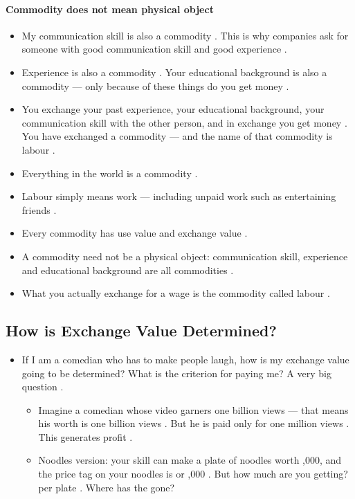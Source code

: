 \paragraph{Commodity does not mean physical object}
\begin{itemize}
    \item My communication skill is also a commodity . This is why companies ask for someone with good communication skill and good experience .
    \item Experience is also a commodity . Your educational background is also a commodity --- only because of these things do you get money .
    \item You exchange your past experience, your educational background, your communication skill with the other person, and in exchange you get money . You have exchanged a commodity --- and the name of that commodity is labour .
    \item Everything in the world is a commodity .
\end{itemize}

\begin{QuickRevision}
\begin{itemize}
    \item Labour simply means work --- including unpaid work such as entertaining friends .
    \item Every commodity has use value and exchange value .
    \item A commodity need not be a physical object: communication skill, experience and educational background are all commodities .
    \item What you actually exchange for a wage is the commodity called labour .
\end{itemize}
\end{QuickRevision}

\subsection{How is Exchange Value Determined?}
\begin{itemize}
    \item If I am a comedian who has to make people laugh, how is my exchange value going to be determined? What is the criterion for paying me? A very big question .
    \begin{itemize}
        \item Imagine a comedian whose video garners one billion views --- that means his worth is one billion views . But he is paid only for one million views . This generates profit .
        \item Noodles version: your skill can make a plate of noodles worth ,000, and the price tag on your noodles is  or ,000 . But how much are you getting?  per plate . Where has the  gone? 
    \end{itemize}
\end{itemize}


